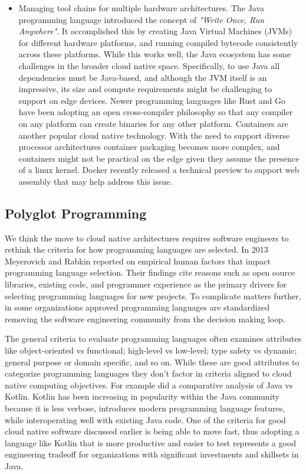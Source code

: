 \documentclass[conference]{IEEEtran}
\begin{document}
\begin{itemize}
	\item Managing tool chains for multiple hardware architectures.  The Java programming language introduced the concept of \textit{"Write Once, Run Anywhere"}. It accomplished this by creating Java Virtual Machines (JVMs) for different hardware platforms, and running compiled bytecode consistently across these platforms.  While this works well, the Java ecosystem has some challenges in the broader cloud native space.  Specifically, to use Java all dependencies must be Java-based, and although the JVM itself is an impressive, its size and compute requirements might be challenging to support on edge devices. Newer programming languages like Rust and Go have been adopting an open cross-compiler philosophy so that any compiler on any platform can create binaries for any other platform.  Containers are another popular cloud native technology.  With the need to support diverse processor architectures container packaging becomes more complex, and containers might not be practical on the edge given they assume the presence of a linux kernel.  Docker recently released a technical preview to support web assembly that may help address this issue\cite{DockerWASM}.
\end{itemize}
 
\subsection{Polyglot Programming}
We think the move to cloud native architectures requires software engineers to rethink the criteria for how programming languages are selected.  In 2013 Meyerovich and Rabkin\cite{meyerovich2013empirical} reported on empirical human factors that impact programming language selection.  Their findings cite reasons such as open source libraries, existing code, and programmer experience as the primary drivers for selecting programming languages for new projects. To complicate matters further, in some organizations approved programming languages are standardized removing the software engineering community from the decision making loop.

The general criteria to evaluate programming languages often examines attributes like object-oriented vs functional; high-level vs low-level; type safety vs dynamic; general purpose or domain specific, and so on.  While these are good attributes to categorize programming languages they don't factor in criteria aligned to cloud native computing objectives.  For example\cite{flauzino2018you} did a comparative analysis of Java vs Kotlin.  Kotlin has been increasing in popularity within the Java community because it is less verbose, introduces modern programming language features, while interoperating well with existing Java code.  One of the criteria for good cloud native software discussed earlier is being able to move fast, thus adopting a language like Kotlin that is more productive and easier to test represents a good engineering tradeoff for organizations with significant investments and skillsets in Java. 
\end{document}
